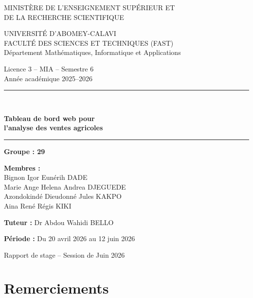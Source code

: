 \documentclass[11pt,a4paper]{report}
\begin{document}
\begin{titlepage}
\centering
{\normalsize
MINISTÈRE DE L'ENSEIGNEMENT SUPÉRIEUR ET\\
DE LA RECHERCHE SCIENTIFIQUE\par}
\vspace{0.6cm}
{\normalsize
UNIVERSITÉ D'ABOMEY-CALAVI\\
FACULTÉ DES SCIENCES ET TECHNIQUES (FAST)\\
Département Mathématiques, Informatique et Applications\par}
\vspace{0.4cm}
{\normalsize Licence 3 -- MIA -- Semestre 6\\
Année académique 2025--2026\par}

\vspace{1.8cm}
\rule{\linewidth}{0.5pt}\\[0.6cm]
{\huge\bfseries Tableau de bord web pour\\[0.2cm]
l'analyse des ventes agricoles\par}
\vspace{0.5cm}
\rule{\linewidth}{0.5pt}

\vspace{1.6cm}
{\large\textbf{Groupe : 29}\par}
\vspace{0.5cm}
{\large
\textbf{Membres :}\\[0.2cm]
Bignon Igor Eunérih DADE\\
Marie Ange Helena Andrea DJEGUEDE\\
Azondokindé Dieudonné Jules KAKPO\\
Aina René Régis KIKI\par}

\vspace{1.2cm}
{\large\textbf{Tuteur :} Dr Abdou Wahidi BELLO\par}
\vspace{0.4cm}
{\large\textbf{Période :} Du 20 avril 2026 au 12 juin 2026\par}

\vfill
{\large Rapport de stage -- Session de Juin 2026\par}
\end{titlepage}


\chapter*{Remerciements}
\end{document}
